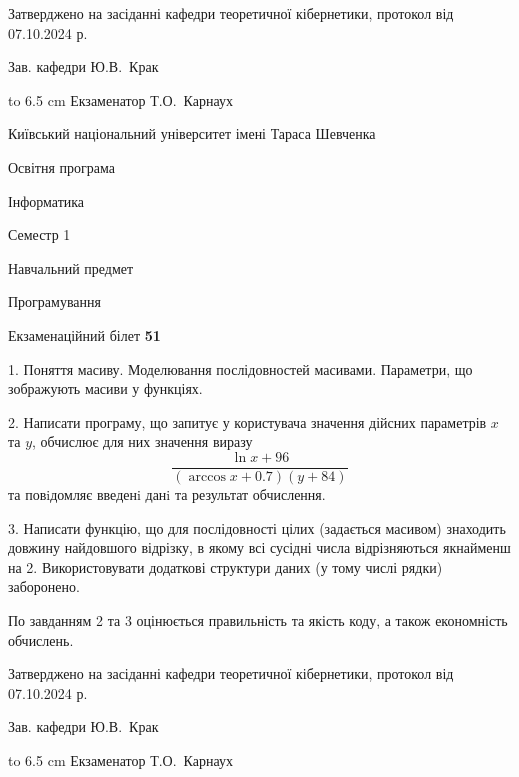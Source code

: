 \documentclass[12pt, ukrainian]{article}
\begin{document}
{\smallskip\smallskip \begin {scriptsize} Затверджено на засіданні кафедри теоретичної кібернетики, протокол   від   07.10.2024 р.\par\smallskip\smallskip\smallskip\smallskip
{\parbox {6.5 cm} {Зав. кафедри \dotfill Ю.В.~Крак}}\hspace {0.7cm} {\hbox to 6.5 cm { Екзаменатор \dotfill Т.О.~Карнаух}} \end{scriptsize}}
\vspace{0.9cm}
{{\begin {scriptsize}\par
{ \center  Київський національний університет імені Тараса Шевченка \par}
{\parbox {5 cm}{Освітня програма \hfill}{\parbox {7 cm}{Інформатика\hfill}}\parbox {6 cm}{\hfill Семестр 1}}\par
{\parbox {5 cm} {Навчальний предмет \hfill}\parbox {7 cm}{Програмування \hfill}\parbox {6cm}{\hfill}\par}\vspace{-15pt} \end{scriptsize}}{\center Екзаменаційний білет \No \textbf { 51 }\par}}
{%
1. Поняття масиву. Моделювання послідовностей масивами. Параметри, що зображують масиви у функціях.%
\par
2. Написати програму, що запитує у користувача значення дійсних параметрів $x$ та $y$, обчислює для них значення виразу 
$$\frac{\ln x + 96}{(\arccos x + 0.7) (y + 84)}$$ 
та повiдомляє введенi данi та результат обчислення.

\par
3. Написати функцію, що для послідовності цілих (задається масивом) знаходить довжину найдовшого відрізку, в якому всі сусідні числа відрізняються якнайменш на 2. Використовувати додаткові структури даних (у тому числі рядки) заборонено.

По завданням 2 та 3 оцінюється правильність та якість коду, а також економність обчислень.

}
{\smallskip\smallskip \begin {scriptsize} Затверджено на засіданні кафедри теоретичної кібернетики, протокол   від   07.10.2024 р.\par\smallskip\smallskip\smallskip\smallskip
{\parbox {6.5 cm} {Зав. кафедри \dotfill Ю.В.~Крак}}\hspace {0.7cm} {\hbox to 6.5 cm { Екзаменатор \dotfill Т.О.~Карнаух}} \end{scriptsize}}
\end{document}
